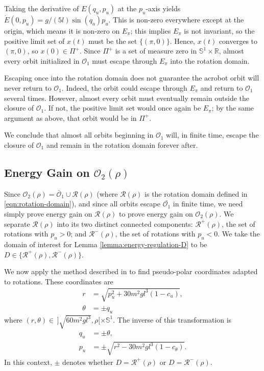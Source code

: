 \documentclass[journal,twoside,web, onecolumn, draftcls]{ieeecolor}
\newcommand*{\R}{\mathbb{R}}
\newcommand*{\Sone}{\mathbb{S}^1}
\newcommand*{\SxR}{\Sone \times \R}
\begin{document}
Taking the derivative of \(E(q_u,p_u)\) at the \(p_u\)-axis yields
\(\dot{E}(0,p_u) = g/(5l) \sin(q_a)p_u\).
This is non-zero everywhere except at the origin, which means it is non-zero on
\(E_\pi\); this implies \(E_\pi\) is not invariant, so the positive limit set of 
\(x(t)\) must be the set \(\{(\pi,0)\}\). Hence, \(x(t)\) converges to 
\((\pi,0)\), so \(x(0) \in \Pi^+\).
Since \(\Pi^+\) is a set of measure zero in \(\SxR\), almost every orbit
initialized in \(\mathcal{O}_1\) must escape through \(E_\pi\) into the rotation
domain.

Escaping once into the rotation domain does not guarantee the acrobot
orbit will never return to \(\mathcal{O}_1\).
Indeed, the orbit could escape through \(E_\pi\) and return to \(\mathcal{O}_1\)
several times.
However, almost every orbit must eventually remain outside the closure of 
\(\mathcal{O}_1\). 
If not, the positive limit set would once again be
\(E_\pi\); by the same argument as above, that orbit would be in \(\Pi^+\).

We conclude that almost all orbits beginning in \(\mathcal{O}_1\) will, in
finite time, escape the closure of \(\mathcal{O}_1\) and remain in the rotation
domain forever after.

\subsection{Energy Gain on \(\mathcal{O}_2(\rho)\)}
Since \(\mathcal{O}_2(\rho) = \bar{\mathcal{O}}_1 \cup \mathcal{R}(\rho)\)
(where \(\mathcal{R}(\rho)\) is the rotation domain defined in
\eqref{eqn:rotation-domain}), and since all orbits escape 
\(\bar{\mathcal{O}_1}\) in finite time, we need simply prove energy gain on
\(\mathcal{R}(\rho)\) to prove energy gain on \(\mathcal{O}_2(\rho)\).
We separate \(\mathcal{R}(\rho)\) into its two distinct connected components:
\(\mathcal{R}^+(\rho)\), the set of rotations with \(p_u > 0\); 
and \(\mathcal{R}^-(\rho)\), the set of rotations with \(p_u < 0\).
We take the domain of interest for Lemma \ref{lemma:energy-regulation-D} to be
\(D \in \{\mathcal{R}^+(\rho), \mathcal{R}^-(\rho)\}\).

We now apply the method described in
\cite{dynamic_vhcs_stabilize_closed_orbits} to find pseudo-polar coordinates
adapted to rotations.
These coordinates are 
\begin{align}
    \label{eqn:r-rot}
    r &= \sqrt{p_u^2 + 30m^2gl^3(1-c_u)}
    , \\
    \label{eqn:theta-rot}
    \theta &= \pm q_u
\end{align}
where \((r,\theta) \in \, ]\sqrt{60m^2gl^3}, \rho[ \times \Sone\).
The inverse of this transformation is
\begin{align*}
    q_u &= \pm \theta
    , \\
    p_u &= \pm \sqrt{r^2-30m^2gl^3(1-c_\theta)}
    .
\end{align*}
In this context, \(\pm\) denotes whether \(D=\mathcal{R}^+(\rho)\) or
\(D=\mathcal{R}^-(\rho)\).
\end{document}
